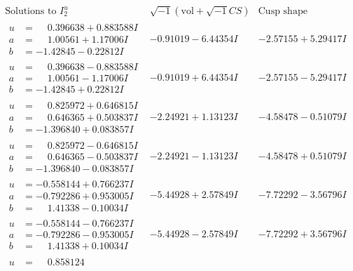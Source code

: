 \documentclass[1p]{elsarticle_modified}
\theoremstyle{definition}
\newcommand{\I}{\sqrt{-1}}
\begin{document}
$$\begin{array}{c|c|c}  
\text{Solutions to }I^u_{2}& \I (\text{vol} + \sqrt{-1}CS) & \text{Cusp shape}\\
 \hline 
\begin{aligned}
u &= \phantom{-}0.396638 + 0.883588 I \\
a &= \phantom{-}1.00561 + 1.17006 I \\
b &= -1.42845 - 0.22812 I\end{aligned}
 & -0.91019 - 6.44354 I & -2.57155 + 5.29417 I \\ \hline\begin{aligned}
u &= \phantom{-}0.396638 - 0.883588 I \\
a &= \phantom{-}1.00561 - 1.17006 I \\
b &= -1.42845 + 0.22812 I\end{aligned}
 & -0.91019 + 6.44354 I & -2.57155 - 5.29417 I \\ \hline\begin{aligned}
u &= \phantom{-}0.825972 + 0.646815 I \\
a &= \phantom{-}0.646365 + 0.503837 I \\
b &= -1.396840 + 0.083857 I\end{aligned}
 & -2.24921 + 1.13123 I & -4.58478 - 0.51079 I \\ \hline\begin{aligned}
u &= \phantom{-}0.825972 - 0.646815 I \\
a &= \phantom{-}0.646365 - 0.503837 I \\
b &= -1.396840 - 0.083857 I\end{aligned}
 & -2.24921 - 1.13123 I & -4.58478 + 0.51079 I \\ \hline\begin{aligned}
u &= -0.558144 + 0.766237 I \\
a &= -0.792286 + 0.953005 I \\
b &= \phantom{-}1.41338 - 0.10034 I\end{aligned}
 & -5.44928 + 2.57849 I & -7.72292 - 3.56796 I \\ \hline\begin{aligned}
u &= -0.558144 - 0.766237 I \\
a &= -0.792286 - 0.953005 I \\
b &= \phantom{-}1.41338 + 0.10034 I\end{aligned}
 & -5.44928 - 2.57849 I & -7.72292 + 3.56796 I \\ \hline\begin{aligned}
u &= \phantom{-}0.858124\phantom{ +0.000000I} \\

\end{aligned}
\end{array}$$
\end{document}
